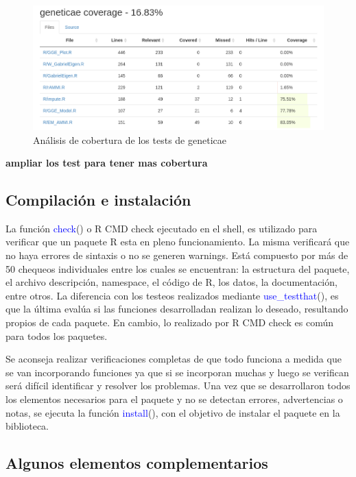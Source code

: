  \begin{figure}[H]
	\begin{center}
		\includegraphics[width=14cm]{./Graficos/Cobertura.png}	
	\end{center}
	\caption{Análisis de cobertura de los tests de geneticae}
	\label{fig:fig35}
\end{figure}

{\LARGE{\textbf{ampliar los test para tener mas cobertura}}}



\subsection{Compilación e instalación}

La función \textcolor{blue}{check}() o R CMD check ejecutado en el shell, es utilizado para verificar que un paquete R esta en pleno funcionamiento. La misma verificará que no haya errores de sintaxis o no se generen warnings. Está compuesto por más de 50 chequeos individuales entre los cuales se encuentran: la estructura del paquete, el archivo descripción, namespace, el código de R, los datos, la documentación, entre otros.  La diferencia con los testeos realizados mediante \textcolor{blue}{use\_testthat}(), es que la última evalúa si las funciones desarrolladan realizan lo deseado, resultando propios de cada paquete. En cambio, lo realizado por R CMD check es común para todos los paquetes. 

Se aconseja realizar verificaciones completas de que todo funciona a medida que se van incorporando funciones ya que si se incorporan muchas y luego se verifican será difícil identificar y resolver los problemas. Una vez que se desarrollaron todos los elementos necesarios para el paquete y no se detectan errores, advertencias o notas, se ejecuta la función \textcolor{blue}{install}(), con el objetivo de instalar el paquete en la biblioteca.


\subsection{Algunos elementos complementarios}

